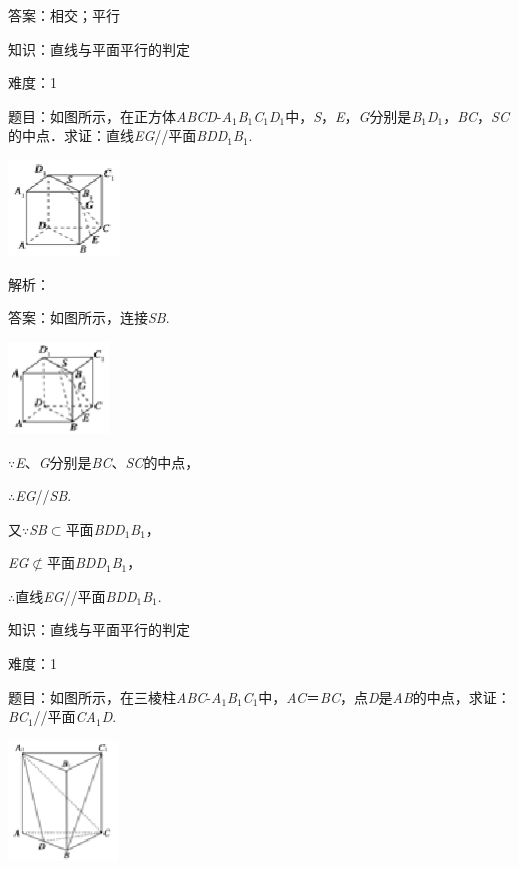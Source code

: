 \documentclass{article} %
\begin{document}
答案：相交；平行

知识：直线与平面平行的判定

难度：1

题目：如图所示，在正方体\textit{ABCD}-\textit{A}${}_{1}$\textit{B}${}_{1}$\textit{C}${}_{1}$\textit{D}${}_{1}$中，\textit{S}，\textit{E}，\textit{G}分别是\textit{B}${}_{1}$\textit{D}${}_{1}$，\textit{BC}，\textit{SC}的中点．求证：直线\textit{EG}//平面\textit{BDD}${}_{1}$\textit{B}${}_{1}$.

\includegraphics*[width=1.17in, height=1.00in, keepaspectratio=false]{image133}

解析：

答案：如图所示，连接\textit{SB}.

\includegraphics*[width=1.06in, height=0.96in, keepaspectratio=false]{image134}

$\mathrm{\because}$\textit{E}、\textit{G}分别是\textit{BC}、\textit{SC}的中点，

$\mathrm{\therefore}$\textit{EG}//\textit{SB}.

又$\mathrm{\because}$\textit{SB}$\mathrm{\subset }$平面\textit{BDD}${}_{1}$\textit{B}${}_{1}$，

\textit{EG}$\mathrm{\nsubset}$平面\textit{BDD}${}_{1}$\textit{B}${}_{1}$，

$\mathrm{\therefore}$直线\textit{EG}//平面\textit{BDD}${}_{1}$\textit{B}${}_{1}$.

知识：直线与平面平行的判定

难度：1

题目：如图所示，在三棱柱\textit{ABC}-\textit{A}${}_{1}$\textit{B}${}_{1}$\textit{C}${}_{1}$中，\textit{AC}＝\textit{BC}，点\textit{D}是\textit{AB}的中点，求证：\textit{BC}${}_{1}$//平面\textit{CA}${}_{1}$\textit{D}.

\includegraphics*[width=1.15in, height=1.25in, keepaspectratio=false]{image135}
\end{document}
